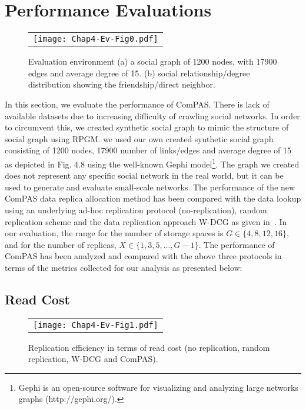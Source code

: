 \section{Performance Evaluations}\label{Chap4_05}
\begin{figure}[h]
\begin{center}
  \begin{tabular}{c}
  \texttt{[image: Chap4-Ev-Fig0.pdf]}
  \end{tabular}
  \caption{Evaluation environment (a) a social graph of 1200 nodes, with 17900 edges and average degree of 15. (b) social relationship/degree distribution showing the friendship/direct neighbor.}
\end{center}
\end{figure}

In this section, we evaluate the performance of ComPAS. There is lack of available datasets due to increasing difficulty of crawling social networks. In order to circumvent this, we created synthetic social graph to mimic the structure of social graph using RPGM. we used our own created synthetic social graph consisting of 1200 nodes, 17900 number of links/edges and average degree of 15 as depicted in Fig. 4.8 using the well-known Gephi model\footnote{Gephi is an open-source software for visualizing and analyzing large networks graphs (http://gephi.org/).}. The graph we created does not represent any specific social network in the real world, but it can be used to generate and evaluate small-scale networks. The performance of the new ComPAS data replica allocation method has been compared with the data lookup using an underlying ad-hoc replication protocol (no-replication), random replication scheme and the data replication approach W-DCG as given in~\cite{SJain2013}. In our evaluation, the range for the number of storage spaces is $G \in \{4,8,12,16\}$, and for the number of replicas, $X \in \{1,3,5,...,G-1\}$. The performance of ComPAS has been analyzed and compared with the above three protocols in terms of the metrics collected for our analysis as presented below:

\subsection{Read Cost}\label{Chap4_05_01}

\begin{figure}[h]
\begin{center}
  \begin{tabular}{c}
  \texttt{[image: Chap4-Ev-Fig1.pdf]}
  \end{tabular}
  \caption{Replication efficiency in terms of read cost (no replication, random replication, W-DCG and ComPAS).}
\end{center}
\end{figure}

